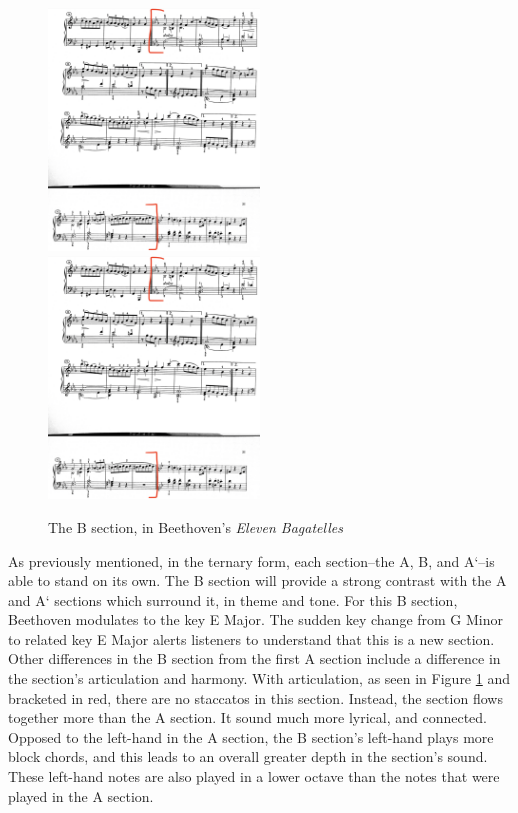\begin{figure}
	\centering
	\includegraphics[width=0.5\textwidth]{figures/beethoven-b-section.jpg}
	\includegraphics[width=0.5\textwidth]{figures/beethoven-b-section-part-two.jpg}
	\caption{The B section, in Beethoven's \textit{Eleven Bagatelles}}
	\label{fig:beethoven-b-section}
\end{figure}

As previously mentioned, in the ternary form, each section--the A, B, and A`--is able to stand on its own. The B section will provide a strong contrast with the A and A` sections which surround it, in theme and tone. For this B section, Beethoven modulates to the key E\musFlat{} Major. The sudden key change from G Minor to related key E\musFlat{} Major alerts listeners to understand that this is a new section. Other differences in the B section from the first A section include a difference in the section's articulation and harmony. With articulation, as seen in Figure \ref{fig:beethoven-b-section}\autocite{Henle_1978} and bracketed in red, there are no staccatos in this section. Instead, the section flows together more than the A section. It sound much more lyrical, and connected. Opposed to the left-hand in the A section, the B section's left-hand plays more block chords, and this leads to an overall greater depth in the section's sound. These left-hand notes are also played in a lower octave than the notes that were played in the A section. 

